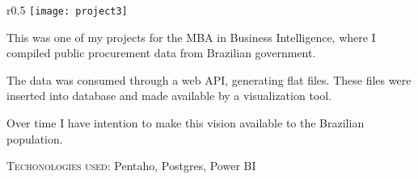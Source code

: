 

     \cvparagraph
     {
      \begin{wrapfigure}{r}{0.5\textwidth}
        \centering
        \vspace{-10pt}
        \texttt{[image: project3]}
      \end{wrapfigure}
      This was one of my projects for the MBA in Business Intelligence, where I compiled public procurement data from Brazilian government.

      The data was consumed through a web API, generating flat files. These files were inserted into database and made available by a visualization tool.

      Over time I have intention to make this vision available to the Brazilian population.

      \textsc{Techonologies used}: Pentaho, Postgres, Power BI
      \vfill
    }
